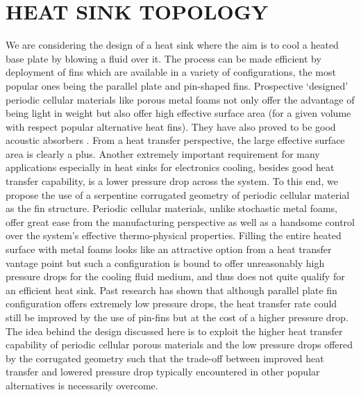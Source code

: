 \documentclass[twocolumn,10pt,cleanfoot]{ihmtc}
\begin{document}
\section{HEAT SINK TOPOLOGY}
%
We are considering the design of a heat sink where the aim is to cool a heated base plate by blowing a fluid over it. The process can be made efficient by deployment of fins which are
available in a variety of configurations, the most popular ones being
the parallel plate and pin-shaped fins. Prospective `designed' periodic cellular materials like porous metal
foams not only offer the advantage of being light in weight but also offer high effective surface
area (for a given volume with respect popular alternative heat fins). They have also proved to be good acoustic absorbers \cite{BM_U}. From a heat transfer
perspective, the large effective surface area is clearly a plus. Another extremely important requirement for many applications especially in heat sinks for electronics cooling, besides good heat transfer capability, is a lower pressure drop across the system. To this
end, we propose the use of a serpentine corrugated geometry of periodic
cellular material as the fin structure. Periodic cellular materials, unlike stochastic metal foams, offer great ease from the manufacturing perspective as well as a handsome control over the system's effective thermo-physical properties. Filling the entire heated
surface with metal foams looks like an attractive option from a heat
transfer vantage point but such a configuration is bound to offer
unreasonably high pressure drops for the cooling fluid medium, and thus does not quite qualify for an efficient
heat sink. Past research \cite{gallego2003carbon} has shown that although parallel plate fin configuration
offers extremely low pressure drops, the heat transfer rate could still
be improved by the use of pin-fins but at the cost of a higher pressure
drop. The idea behind the design discussed here is to exploit the higher heat transfer capability of
periodic cellular porous materials and the low pressure drops offered
by the corrugated geometry \cite{aboelsoud2013study} such that the trade-off between improved
heat transfer and lowered pressure drop typically encountered in other
popular alternatives is necessarily overcome.
%
\end{document}
